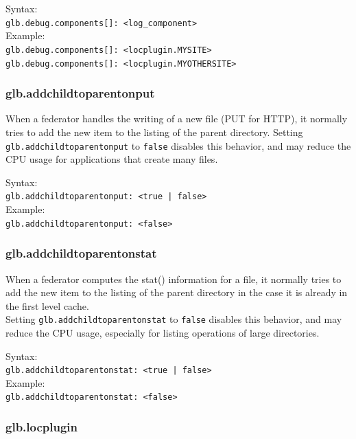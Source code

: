 \documentclass[12pt]{article} %
\begin{document}
 Syntax:\\

\lstinline"glb.debug.components[]: <log_component>"\\

 Example:\\
\lstinline"glb.debug.components[]: <locplugin.MYSITE>"\\
\lstinline"glb.debug.components[]: <locplugin.MYOTHERSITE>"\\


\subsubsection{glb.addchildtoparentonput}
 When a federator handles the writing of a new file (PUT for HTTP), it normally tries to add the new item to the listing
of the parent directory. Setting \lstinline"glb.addchildtoparentonput" to \lstinline"false" disables this behavior, and may
reduce the CPU usage for applications that create many files.

 Syntax:\\

\lstinline"glb.addchildtoparentonput: <true | false>"\\

 Example:\\
\lstinline"glb.addchildtoparentonput: <false>"\\


\subsubsection{glb.addchildtoparentonstat}
 When a federator computes the stat() information for a file, it normally tries to add the new item to the listing
of the parent directory in the case it is already in the first level cache.\\
Setting \lstinline"glb.addchildtoparentonstat" to \lstinline"false" disables this behavior, and may reduce the CPU usage, especially for listing operations of large directories.

 Syntax:\\

\lstinline"glb.addchildtoparentonstat: <true | false>"\\

 Example:\\
\lstinline"glb.addchildtoparentonstat: <false>"\\


\subsubsection{\label{glb.locplugin}glb.locplugin}
\end{document}
